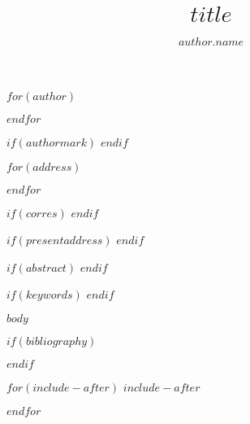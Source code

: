 \documentclass[AMA,STIX1COL,$for(classoption)$$classoption$$sep$,$endfor$]{WileyNJD-v2}
\begin{document}
\title{$title$}

$for(author)$
\author[$author.num$]{$author.name$}
$endfor$

$if(authormark)$
$endif$

$for(address)$
\address[$address.num$]{$address.org$}
$endfor$

$if(corres)$
$endif$

$if(presentaddress)$
$endif$

$if(abstract)$
$endif$

$if(keywords)$
$endif$

\maketitle

$body$

$if(bibliography)$

$endif$

$for(include-after)$
$include-after$

$endfor$
\end{document}
